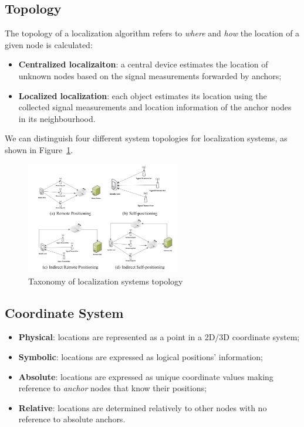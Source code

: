 \documentclass[a4paper,12pt]{article}
\begin{document}
\subsection{Topology}
The topology of a localization algorithm refers to \textit{where} and \textit{how} the location of a given node is calculated:

\begin{itemize}
	\item \textbf{Centralized localizaiton}: a central device estimates the location of unknown nodes based on the signal measurements forwarded by anchors;
	\item \textbf{Localized localization}: each object estimates its location using the collected signal measurements and location information of the anchor nodes in its neighbourhood.
\end{itemize}

We can distinguish four different system topologies for localization systems, as shown in Figure~\ref{fig:topology}.
\begin{figure}
	\centering
  \includegraphics[width=0.6\textwidth]{img/topology}
  \caption{\label{fig:topology}Taxonomy of localization systems topology}
\end{figure}

\subsection{Coordinate System}
\begin{itemize}
  \item \textbf{Physical}: locations are represented as a point in a 2D/3D coordinate system;
  \item \textbf{Symbolic}: locations are expressed as logical positions’ information;
  \item \textbf{Absolute}: locations are expressed as unique coordinate values making reference to \textit{anchor} nodes that know their positions;
  \item \textbf{Relative}: locations are determined relatively to other nodes with no reference to absolute anchors.
\end{itemize}
\end{document}

